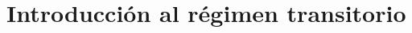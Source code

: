 \documentclass[11pt]{book} %
\begin{document}
	
	\section{Introducción al régimen transitorio}
	
\end{document}
